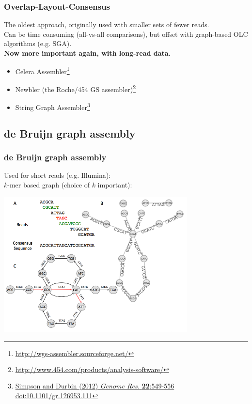 \begin{frame}
  \frametitle{Overlap-Layout-Consensus}
  The oldest approach, originally used with smaller sets of fewer reads. \\[0.5cm]
  Can be time consuming (all-vs-all comparisons), but offset with graph-based OLC algorithms (e.g. SGA).\\[0.5cm]
  \textbf{Now more important again, with long-read data.}\\[0.5cm]
  \begin{itemize}
    \item Celera Assembler\footnote{\tiny{\href{http://wgs-assembler.sourceforge.net/}{http://wgs-assembler.sourceforge.net/}}}
    \item Newbler (the Roche/454 GS assembler)\footnote{\tiny{\href{http://www.454.com/products/analysis-software/}{http://www.454.com/products/analysis-software/}}}
    \item String Graph Assembler\footnote{\tiny{\href{http://dx.doi.org/10.1101/gr.126953.111}{Simpson and Durbin (2012) \textit{Genome Res.} \textbf{22}:549-556 doi:10.1101/gr.126953.111}}}
  \end{itemize}
\end{frame}

\subsection{de Bruijn graph assembly}

\begin{frame}
  \frametitle{de Bruijn graph assembly}
  Used for short reads (e.g. Illumina):\\[0.25cm]
  $k$-mer based graph (choice of $k$ important):
  \begin{center}
    \includegraphics[width=0.75\textwidth]{images/deBruijn3}
  \end{center}  
\end{frame}

